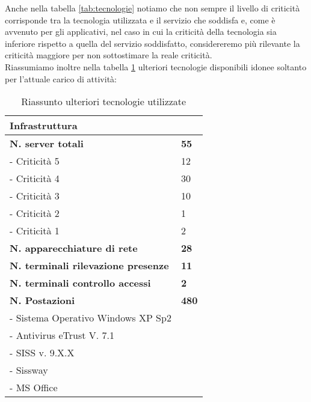 Anche nella tabella \ref{tab:tecnologie} notiamo che non sempre il livello di criticità corrisponde tra la tecnologia utilizzata e il servizio che soddisfa e, come è avvenuto per gli applicativi,  nel caso in cui la criticità della tecnologia sia inferiore rispetto a quella del servizio soddisfatto, considereremo più rilevante la criticità maggiore per non sottostimare la reale criticità. \\


Riassumiamo inoltre nella tabella \ref{tab:infrastruttureGenerali} ulteriori tecnologie disponibili idonee soltanto per l’attuale carico di attività:
\begin{table}[h] 
	\centering
	\begin{tabular}{|l|l|}
		\hline
		\rowcolor[HTML]{EFEFEF} 
		\textbf{Infrastruttura} & \\ \hline
		\textbf{N. server totali}					& \textbf{55} \\
		- Criticità 5 				& 12 \\
		- Criticità 4				& 30 \\
		- Criticità 3				& 10 	\\
		- Criticità 2				& 1 	\\ 
		- Criticità 1				& 2 	\\  \hline
		\textbf{N. apparecchiature di rete}  				& \textbf{28}			\\\hline
		\textbf{N. terminali rilevazione presenze}	  			& \textbf{11}		\\\hline
		\textbf{N. terminali controllo accessi}	  			& \textbf{2}		\\\hline
		\textbf{N. Postazioni}					& \textbf{480} \\
		- Sistema Operativo Windows XP Sp2 & \\
		- Antivirus eTrust V. 7.1 & \\
		- SISS v. 9.X.X & \\
		- Sissway & \\
		- MS Office & \\  \hline
	\end{tabular}
	\caption{Riassunto ulteriori tecnologie utilizzate}\label{tab:infrastruttureGenerali}
\end{table}
	